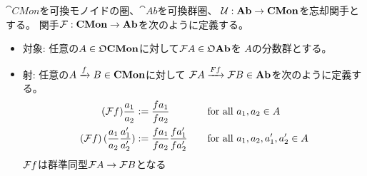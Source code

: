 	$\cat{CMon}$を可換モノイドの圏、$\cat{Ab}$を可換群圏、
	${\mathcal{U}}:{\mathbf{Ab}}\to{\mathbf{CMon}}$を忘却関手とする。
	関手${\mathcal{F}}:{\mathbf{CMon}}\to{\mathbf{Ab}}$を次のように定義する。
	\begin{itemize}\setlength{\itemsep}{-1mm} %
		\item 対象: 任意の$A\in{\mathfrak{O}}{\mathbf{CMon}}$に対して${\mathcal{F}} A\in{\mathfrak{O}}{\mathbf{Ab}}$を
		$A$の分数群とする。
		\item 射:	任意の$A\xrightarrow[{}]{f}B\in{\mathbf{CMon}}$に対して
		${\mathcal{F}} A\xrightarrow[{}]{Ff}{\mathcal{F}} B\in{\mathbf{Ab}}$を次のように定義する。
		\begin{alignat*}{2}
			({\mathcal{F}} f)\frac{a_1}{a_2} &:= \frac{fa_1}{fa_2} 
			&\quad&\text{for all } a_1,a_2\in A \\
			({\mathcal{F}} f)\mathinner{({\frac{a_1}{a_2}\frac{a_1'}{a_2'}})} 
			&:= \frac{fa_1}{fa_2}\frac{fa_1'}{fa_2'}
			&\quad&\text{for all } a_1,a_2,a_1',a_2'\in A
		\end{alignat*}
		${\mathcal{F}} f$は群準同型${\mathcal{F}} A\to{\mathcal{F}} B$となる
	\end{itemize} %

